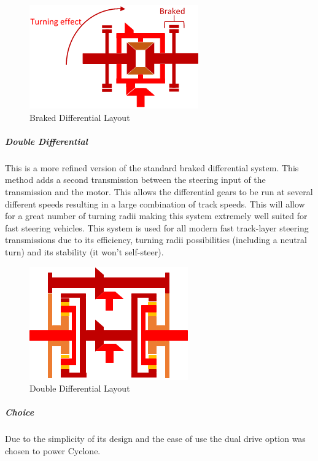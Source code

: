 \begin{figure}[h]
\centering\includegraphics[width=0.6\linewidth]{Images/DT_Fig_13.png}
\caption{Braked Differential Layout}
\label{fig:brakeddiff}
\end{figure}

\subparagraph*{Double Differential}

This is a more refined version of the standard braked differential system. This method adds a second transmission between the steering input of the transmission and the motor. This allows the differential gears to be run at several different speeds resulting in a large combination of track speeds. This will allow for a great number of turning radii making this system extremely well suited for fast steering vehicles. This system is used for all modern fast track-layer steering transmissions due to its efficiency, turning radii possibilities (including a neutral turn) and its stability (it won’t self-steer).\par

\begin{figure}[h]
\centering\includegraphics[width=0.4\linewidth]{Images/DT_Fig_14.png}
\caption{Double Differential Layout}
\label{fig:doublediff}
\end{figure}

\subparagraph*{Choice}

Due to the simplicity of its design and the ease of use the dual drive option was chosen to power Cyclone.\par

